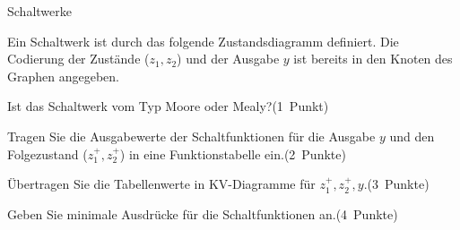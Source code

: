 \documentclass{exercisesheet}
\begin{document}
\begin{eexercises}{Schaltwerke}{
    Ein Schaltwerk ist durch das folgende Zustandsdiagramm definiert. Die Codierung der Zustände ($z_1, z_2$) und der Ausgabe $y$ ist bereits in den Knoten des Graphen angegeben.\par
    \centering
  }
  \item Ist das Schaltwerk vom Typ Moore oder Mealy?\hfill(1~Punkt)
  \item Tragen Sie die Ausgabewerte der Schaltfunktionen für die Ausgabe $y$ und den Folgezustand ($z_1^+, z_2^+$) in eine Funktionstabelle ein.\hfill(2~Punkte)
  \item Übertragen Sie die Tabellenwerte in KV-Diagramme für $z_1^+, z_2^+, y$.\hfill(3~Punkte)
  \item Geben Sie minimale Ausdrücke für die Schaltfunktionen an.\hfill(4~Punkte)
\end{eexercises}
\end{document}
